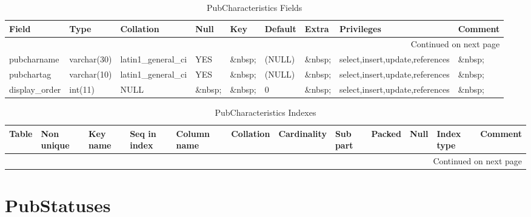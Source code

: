 \documentclass[tablesignature]{scrartcl}
\begin{document}
\begin{longtable}{|l|l|l|l|l|l|l|l|l|}
\caption{PubCharacteristics Fields} \label{tbl:pubcharacteristicsfields}\\
\hline
 Field             &  Type         &  Collation                &  Null     &  Key      &  Default  &  Extra              &  Privileges                       &  Comment \\
\hline
\endhead
\hline\multicolumn{9}{r}{Continued on next page}\
\endfoot
\endlastfoot
\hline
 pubcharid         &  int(11)      &  NULL                     &  \&nbsp;  &  PRI      &  (NULL)   &  auto\_{}increment  &  select,insert,update,references  &  \&nbsp;  \\
 pubcharname       &  varchar(30)  &  latin1\_{}general\_{}ci  &  YES      &  \&nbsp;  &  (NULL)   &  \&nbsp;            &  select,insert,update,references  &  \&nbsp;  \\
 pubchartag        &  varchar(10)  &  latin1\_{}general\_{}ci  &  YES      &  \&nbsp;  &  (NULL)   &  \&nbsp;            &  select,insert,update,references  &  \&nbsp;  \\
 display\_{}order  &  int(11)      &  NULL                     &  \&nbsp;  &  \&nbsp;  &  0        &  \&nbsp;            &  select,insert,update,references  &  \&nbsp;  \\
\hline
\end{longtable}


\begin{longtable}{|l|l|l|l|l|l|l|l|l|l|l|l|}
\caption{PubCharacteristics Indexes} \label{tbl:pubcharacteristicsindexes}\\
\hline
 Table               &  Non unique  &  Key name  &  Seq in index  &  Column name  &  Collation  &  Cardinality  &  Sub part  &  Packed  &  Null     &  Index type  &  Comment \\
\hline
\endhead
\hline\multicolumn{12}{r}{Continued on next page}\
\endfoot
\endlastfoot
\hline
 PubCharacteristics  &           0  &  PRIMARY   &             1  &  pubcharid    &  A          &            4  &  (NULL)    &  (NULL)  &  \&nbsp;  &  BTREE       &  \&nbsp;  \\
\hline
\end{longtable}
\section{PubStatuses}
\label{sec-18}
\end{document}
